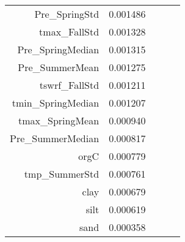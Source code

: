 \begin{tabular}{rrrrr}
Pre_SpringStd & 0.001486 \\
tmax_FallStd & 0.001328 \\
Pre_SpringMedian & 0.001315 \\
Pre_SummerMean & 0.001275 \\
tswrf_FallStd & 0.001211 \\
tmin_SpringMedian & 0.001207 \\
tmax_SpringMean & 0.000940 \\
Pre_SummerMedian & 0.000817 \\
orgC & 0.000779 \\
tmp_SummerStd & 0.000761 \\
clay & 0.000679 \\
silt & 0.000619 \\
sand & 0.000358 \\
\bottomrule
\end{tabular}
